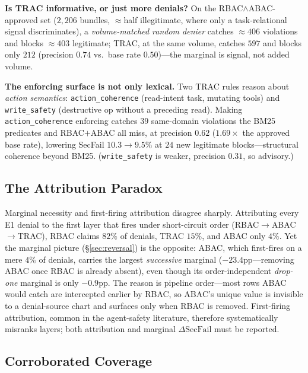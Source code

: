 \documentclass[sigconf,review,anonymous]{acmart}
\begin{document}
\textbf{Is TRAC informative, or just more denials?} On the RBAC$\wedge$ABAC-approved set ($2{,}206$ bundles, $\approx$half illegitimate, where only a task-relational signal discriminates), a \emph{volume-matched random denier} catches $\approx\!406$ violations and blocks $\approx\!403$ legitimate; TRAC, at the same volume, catches $597$ and blocks only $212$ (precision $0.74$ vs.\ base rate $0.50$)---the marginal is signal, not added volume.

\textbf{The enforcing surface is not only lexical.} Two TRAC rules reason about \emph{action semantics}: \texttt{action\_coherence} (read-intent task, mutating tools) and \texttt{write\_safety} (destructive op without a preceding read). Making \texttt{action\_coherence} enforcing catches $39$ same-domain violations the BM25 predicates and RBAC$+$ABAC all miss, at precision $0.62$ ($1.69\times$ the approved base rate), lowering SecFail $10.3\!\to\!9.5\%$ at $24$ new legitimate blocks---structural coherence beyond BM25. (\texttt{write\_safety} is weaker, precision $0.31$, so advisory.)

\subsection{The Attribution Paradox}
\label{sec:per_domain}
\label{sec:attribution_paradox}

Marginal necessity and first-firing attribution disagree sharply. Attributing every E1 denial to the first layer that fires under short-circuit order (RBAC$\to$ABAC$\to$TRAC), RBAC claims $82\%$ of denials, TRAC $15\%$, and ABAC only $4\%$. Yet the marginal picture (\S\ref{sec:reversal}) is the opposite: ABAC, which first-fires on a mere $4\%$ of denials, carries the largest \emph{successive} marginal ($-23.4$pp---removing ABAC once RBAC is already absent), even though its order-independent \emph{drop-one} marginal is only $-0.9$pp. The reason is pipeline order---most rows ABAC would catch are intercepted earlier by RBAC, so ABAC's unique value is invisible to a denial-source chart and surfaces only when RBAC is removed. First-firing attribution, common in the agent-safety literature, therefore systematically misranks layers; both attribution and marginal $\Delta\mathrm{SecFail}$ must be reported.

\subsection{Corroborated Coverage}
\label{sec:corroborated}
\end{document}
